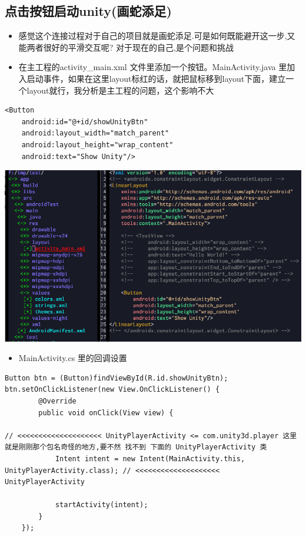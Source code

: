 \documentclass[9pt, b5paper]{article}
\begin{document}
\subsection{点击按钮启动unity(画蛇添足)}
\label{sec-4-5}
\begin{itemize}
\item 感觉这个连接过程对于自己的项目就是画蛇添足.可是如何既能避开这一步,又能两者很好的平滑交互呢? 对于现在的自己,是个问题和挑战
\item 在主工程的activity\_main.xml 文件里添加一个按钮。MainActivity.java 里加入启动事件，如果在这里layout标红的话，就把鼠标移到layout下面，建立一个layout就行，我分析是主工程的问题，这个影响不大
\end{itemize}
\begin{verbatim}
<Button
    android:id="@+id/showUnityBtn"
    android:layout_width="match_parent"
    android:layout_height="wrap_content"
    android:text="Show Unity"/>
\end{verbatim}

\includegraphics[width=.9\linewidth]{./pic/unityToAndroid_20221123_223751.png}
\begin{itemize}
\item MainActivity.cs 里的回调设置
\end{itemize}
\begin{verbatim}
Button btn = (Button)findViewById(R.id.showUnityBtn);
btn.setOnClickListener(new View.OnClickListener() {
        @Override
        public void onClick(View view) {

// <<<<<<<<<<<<<<<<<<<< UnityPlayerActivity <= com.unity3d.player 这里就是刚刚那个包名奇怪的地方,要不然 找不到 下面的 UnityPlayerActivity 类
            Intent intent = new Intent(MainActivity.this, UnityPlayerActivity.class); // <<<<<<<<<<<<<<<<<<<< UnityPlayerActivity

            startActivity(intent);
        }
    });
\end{verbatim}
\end{document}
